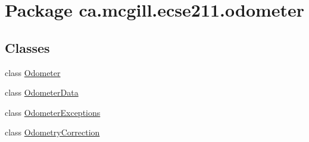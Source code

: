 \hypertarget{namespaceca_1_1mcgill_1_1ecse211_1_1odometer}{}\section{Package ca.\+mcgill.\+ecse211.\+odometer}
\label{namespaceca_1_1mcgill_1_1ecse211_1_1odometer}
\subsection*{Classes}
\begin{DoxyCompactItemize}
\item 
class \hyperlink{classca_1_1mcgill_1_1ecse211_1_1odometer_1_1_odometer}{Odometer}
\item 
class \hyperlink{classca_1_1mcgill_1_1ecse211_1_1odometer_1_1_odometer_data}{Odometer\+Data}
\item 
class \hyperlink{classca_1_1mcgill_1_1ecse211_1_1odometer_1_1_odometer_exceptions}{Odometer\+Exceptions}
\item 
class \hyperlink{classca_1_1mcgill_1_1ecse211_1_1odometer_1_1_odometry_correction}{Odometry\+Correction}
\end{DoxyCompactItemize}

